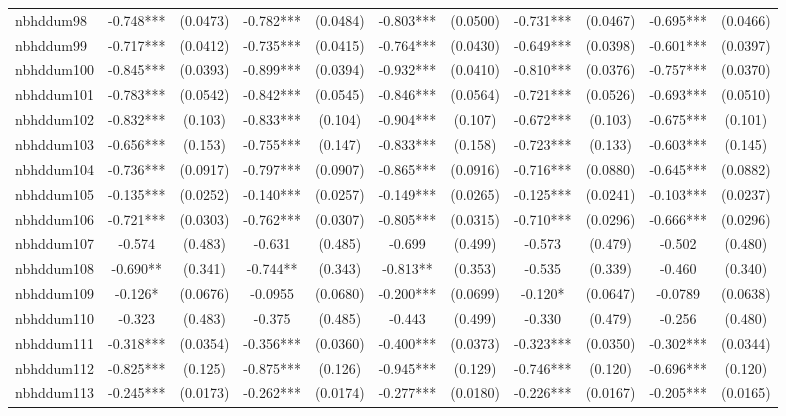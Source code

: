 \documentclass[]{article}
\begin{document}
\begin{tabular}{lcccccccccc}
nbhddum98 & -0.748*** & (0.0473) & -0.782*** & (0.0484) & -0.803*** & (0.0500) & -0.731*** & (0.0467) & -0.695*** & (0.0466) \\
nbhddum99 & -0.717*** & (0.0412) & -0.735*** & (0.0415) & -0.764*** & (0.0430) & -0.649*** & (0.0398) & -0.601*** & (0.0397) \\
nbhddum100 & -0.845*** & (0.0393) & -0.899*** & (0.0394) & -0.932*** & (0.0410) & -0.810*** & (0.0376) & -0.757*** & (0.0370) \\
nbhddum101 & -0.783*** & (0.0542) & -0.842*** & (0.0545) & -0.846*** & (0.0564) & -0.721*** & (0.0526) & -0.693*** & (0.0510) \\
nbhddum102 & -0.832*** & (0.103) & -0.833*** & (0.104) & -0.904*** & (0.107) & -0.672*** & (0.103) & -0.675*** & (0.101) \\
nbhddum103 & -0.656*** & (0.153) & -0.755*** & (0.147) & -0.833*** & (0.158) & -0.723*** & (0.133) & -0.603*** & (0.145) \\
nbhddum104 & -0.736*** & (0.0917) & -0.797*** & (0.0907) & -0.865*** & (0.0916) & -0.716*** & (0.0880) & -0.645*** & (0.0882) \\
nbhddum105 & -0.135*** & (0.0252) & -0.140*** & (0.0257) & -0.149*** & (0.0265) & -0.125*** & (0.0241) & -0.103*** & (0.0237) \\
nbhddum106 & -0.721*** & (0.0303) & -0.762*** & (0.0307) & -0.805*** & (0.0315) & -0.710*** & (0.0296) & -0.666*** & (0.0296) \\
nbhddum107 & -0.574 & (0.483) & -0.631 & (0.485) & -0.699 & (0.499) & -0.573 & (0.479) & -0.502 & (0.480) \\
nbhddum108 & -0.690** & (0.341) & -0.744** & (0.343) & -0.813** & (0.353) & -0.535 & (0.339) & -0.460 & (0.340) \\
nbhddum109 & -0.126* & (0.0676) & -0.0955 & (0.0680) & -0.200*** & (0.0699) & -0.120* & (0.0647) & -0.0789 & (0.0638) \\
nbhddum110 & -0.323 & (0.483) & -0.375 & (0.485) & -0.443 & (0.499) & -0.330 & (0.479) & -0.256 & (0.480) \\
nbhddum111 & -0.318*** & (0.0354) & -0.356*** & (0.0360) & -0.400*** & (0.0373) & -0.323*** & (0.0350) & -0.302*** & (0.0344) \\
nbhddum112 & -0.825*** & (0.125) & -0.875*** & (0.126) & -0.945*** & (0.129) & -0.746*** & (0.120) & -0.696*** & (0.120) \\
nbhddum113 & -0.245*** & (0.0173) & -0.262*** & (0.0174) & -0.277*** & (0.0180) & -0.226*** & (0.0167) & -0.205*** & (0.0165) \\

\end{tabular}
\end{document}
